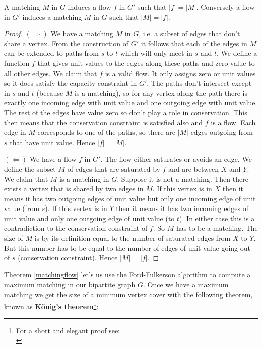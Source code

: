\begin{thm}\label{matchingflow}
A matching $M$ in $G$ induces a flow $f$ in $G'$ such that $|f| = |M|$. Conversely a flow in $G'$ induces a matching $M$ in $G$ such that $|M| = |f|$.
\end{thm}

\begin{proof}
\noindent$(\Rightarrow)$ We have a matching $M$ in $G$, i.e. a subset of edges that don't share a vertex. From the construction of $G'$ it follows that each of the edges in $M$ can be extended to paths from $s$ to $t$ which will only meet in $s$ and $t$. We define a function $f$ that gives unit values to the edges along these paths and zero value to all other edges. We claim that $f$ is a valid flow. It only assigns zero or unit values so it does satisfy the capacity constraint in $G'$. The paths don't intersect except in $s$ and $t$ (because $M$ is a matching), so for any vertex along the path there is exactly one incoming edge with unit value and one outgoing edge with unit value. The rest of the edges have value zero so don't play a role in conservation. This then means that the conservation constraint is satisfied also and $f$ is a flow.
Each edge in $M$ corresponds to one of the paths, so there are $|M|$ edges outgoing from $s$ that have unit value. Hence $|f| = |M|$.

\noindent$(\Leftarrow)$ We have a flow $f$ in $G'$. The flow either saturates or avoids an edge. We define the subset $M$ of edges that are saturated by $f$ and are between $X$ and $Y$. We claim that $M$ is a matching in $G$. Suppose it is not a matching. Then there exists a vertex that is shared by two edges in $M$. If this vertex is in $X$ then it means it has two outgoing edges of unit value but only one incoming edge of unit value (from $s$). If this vertex is in $Y$ then it means it has two incoming edges of unit value and only one outgoing edge of unit value (to $t$). In either case this is a contradiction to the conservation constraint of $f$. So $M$ has to be a matching. The size of $M$ is by its definition equal to the number of saturated edges from $X$ to $Y$. But this number has to be equal to the number of edges of unit value going out of $s$ (conservation constraint). Hence $|M| = |f|$.
\end{proof}

Theorem \ref{matchingflow} let's us use the Ford-Fulkerson algorithm to compute a maximum matching in our bipartite graph $G$. Once we have a maximum matching we get the size of a minimum vertex cover with the following theorem, known as \textbf{K\"onig's theorem}\footnote{For a short and elegant proof see:\\}:

